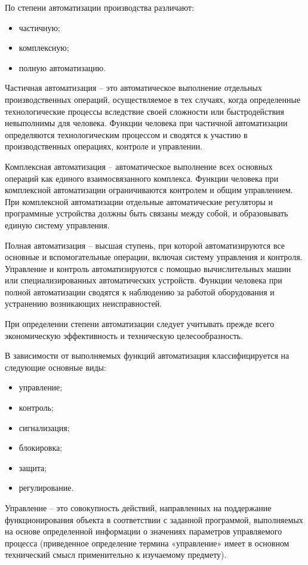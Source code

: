 По степени автоматизации производства различают:

\begin{itemize}
    \item частичную;
    \item комплексную;
    \item полную автоматизацию.
\end{itemize}

Частичная автоматизация -- это автоматическое выполнение отдельных производственных операций, осуществляемое в тех случаях, когда определенные технологические процессы вследствие своей сложности или быстродействия невыполнимы для человека. Функции человека при частичной автоматизации определяются технологическим процессом и сводятся к участию в производственных операциях, контроле и управлении.

Комплексная автоматизация -- автоматическое выполнение всех основных операций как единого взаимосвязанного комплекса. Функции человека при комплексной автоматизации ограничиваются контролем и общим управлением. При комплексной автоматизации отдельные автоматические регуляторы и программные устройства должны быть связаны между собой, и образовывать единую систему управления.

Полная автоматизация -- высшая ступень, при которой автоматизируются все основные и вспомогательные операции, включая систему управления и контроля. Управление и контроль автоматизируются с помощью вычислительных машин или специализированных автоматических устройств. Функции человека при полной автоматизации сводятся к наблюдению за работой оборудования и устранению возникающих неисправностей.

При определении степени автоматизации следует учитывать прежде всего экономическую эффективность и техническую целесообразность.

В зависимости от выполняемых функций автоматизация классифицируется на следующие основные виды: 

\begin{itemize}
    \item управление;
    \item контроль;
    \item сигнализация;
    \item блокировка;
    \item защита;
    \item регулирование.
\end{itemize}

Управление -- это совокупность действий, направленных на поддержание функционирования объекта в соответствии с заданной программой, выполняемых на основе определенной информации о значениях параметров управляемого процесса (приведенное определение термина «управление» имеет в основном технический смысл применительно к изучаемому предмету).


